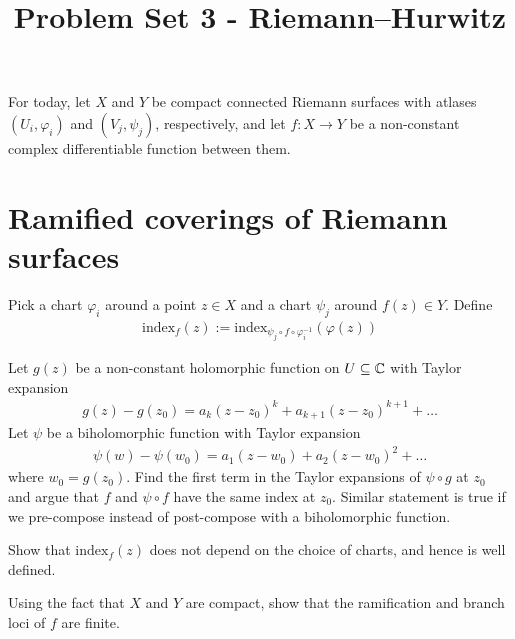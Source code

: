 \documentclass{article}
\begin{document}
  \title{Problem Set 3 - Riemann--Hurwitz}
  \date{}
  \maketitle


For today, let $X$ and $Y$ be compact connected Riemann surfaces with atlases $(U_i, \varphi_i)$ and $(V_j,\psi_j)$, respectively, and let $f: X \rightarrow Y$ be a non-constant complex differentiable function between them.








\section{Ramified coverings of Riemann surfaces}
\begin{definition}
  Pick a chart $\varphi_i$ around a point $z \in X$ and a chart $\psi_j$ around $f(z) \in Y$.
  Define
  \begin{align*}
    \mathrm{index}_f (z) := \mathrm{index}_{\psi_j \circ f \circ \varphi_i^{-1}}( \varphi(z))
  \end{align*}
\end{definition}

\begin{qbox}
  Let $g(z)$ be a non-constant holomorphic function on $U \subseteq \mathbb{C}$ with Taylor expansion
  \begin{align*}
    g(z) - g(z_0) = a_k (z - z_0)^k + a_{k+1} (z-z_0)^{k+1} + \dots
  \end{align*}
  Let $\psi$ be a biholomorphic function with Taylor expansion
  \begin{align*}
    \psi(w) - \psi(w_0) = a_1 (z - w_0) + a_2 (z - w_0)^2 + \dots
  \end{align*}
  where $w_0 = g(z_0)$.
  Find the first term in the Taylor expansions of $\psi \circ g $ at $z_0$ and argue that $f$ and $\psi \circ f $  have the same index at $z_0$.
  Similar statement is true if we pre-compose instead of post-compose with a biholomorphic function.
\end{qbox}

\begin{qbox}
  Show that $\mathrm{index}_f (z)$ does not depend on the choice of charts, and hence is well defined.
\end{qbox}

\begin{qbox}
  Using the fact that $X$ and $Y$ are compact, show that the ramification and branch loci of $f$ are finite.
\end{qbox}
\end{document}
